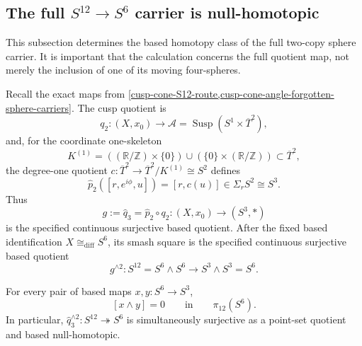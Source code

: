 \subsection{The full \texorpdfstring{\(S^{12}\to S^6\)}{S12-to-S6}
carrier is null-homotopic}
\label{cusp-s12-carrier-homotopy}

This subsection determines the based homotopy class of the full two-copy
sphere carrier.  It is important that the calculation concerns the full
quotient map, not merely the inclusion of one of its moving four-spheres.

Recall the exact maps from
\cref{cusp-cone-S12-route,cusp-cone-angle-forgotten-sphere-carriers}.  The
cusp quotient is
\[
 q_2:(X,x_0)\longrightarrow
 \mathcal A=\operatorname{Susp}(S^1\times\overline T^2),
\]
and, for the coordinate one-skeleton
\[
 K^{(1)}=
 ((\mathbb R/\mathbb Z)\times\{0\})
 \cup(\{0\}\times(\mathbb R/\mathbb Z))\subset\overline T^2,
\]
the degree-one quotient
\(c:\overline T^2\to\overline T^2/K^{(1)}\cong S^2\) defines
\[
 \widehat p_2([r,e^{i\phi},u])=[r,c(u)]
 \in\Sigma_r S^2\cong S^3.
\]
Thus
\[
 g:=\widehat q_3=\widehat p_2\circ q_2:(X,x_0)\longrightarrow(S^3,*)
\]
is the specified continuous surjective based quotient.  After the fixed
based identification \(X\cong_{\mathrm{diff}}S^6\), its smash square is the
specified continuous surjective based quotient
\[
 g^{\wedge2}:S^{12}=S^6\wedge S^6
 \longrightarrow S^3\wedge S^3=S^6.
\]

\begin{theorem}
\label{cusp-s12-full-carrier-null}
For every pair of based maps \(x,y:S^6\to S^3\),
\[
 [x\wedge y]=0\qquad\text{in}\qquad\pi_{12}(S^6).
\]
In particular,
\(\widehat q_3^{\wedge2}:S^{12}\twoheadrightarrow S^6\) is simultaneously
surjective as a point-set quotient and based null-homotopic.
\end{theorem}

